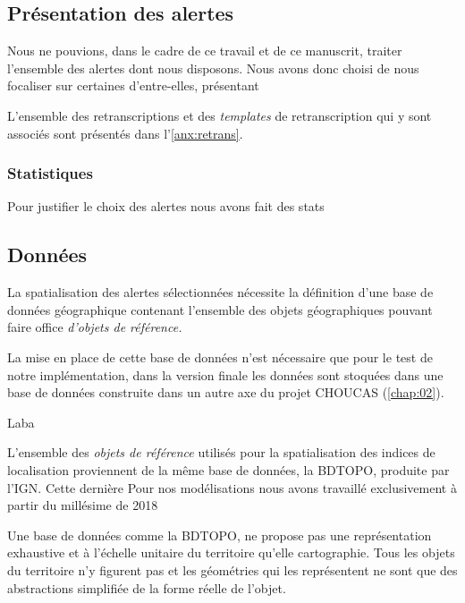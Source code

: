 \subsection{Présentation des alertes}

Nous ne pouvions, dans le cadre de ce travail et de ce manuscrit,
traiter l'ensemble des alertes dont nous disposons. Nous avons donc
choisi de nous focaliser sur certaines d'entre-elles, présentant 




L'ensemble des retranscriptions et des \emph{templates} de
retranscription qui y sont associés sont présentés dans
l'\autoref{anx:retrans}.


\subsubsection{Statistiques}

Pour justifier le choix des alertes nous avons fait des stats 





\subsection{Données}

La spatialisation des alertes sélectionnées nécessite la définition
d'une base de données géographique contenant l'ensemble des objets
géographiques pouvant faire office \emph{d'objets de référence.}

La mise en place de cette base de données n'est nécessaire que pour le
test de notre implémentation, dans la version finale les données sont
stoquées dans une base de données construite dans un autre axe du
projet CHOUCAS (\autoref{chap:02}).

Laba 

L'ensemble des \emph{objets de référence} utilisés pour la
spatialisation des indices de localisation proviennent de la même base
de données, la BDTOPO, produite par l'IGN. Cette dernière
%
Pour nos modélisations nous avons travaillé exclusivement à partir du
millésime de 2018


Une base de données comme la BDTOPO, ne propose pas une représentation
exhaustive et à l'échelle unitaire du territoire qu'elle
cartographie. Tous les objets du territoire n'y figurent pas et les
géométries qui les représentent ne sont que des abstractions
simplifiée de la forme réelle de l'objet.

